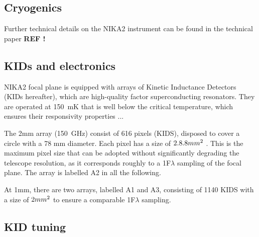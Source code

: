 \subsection{Cryogenics}
Further technical details on the NIKA2 instrument can be found in the
technical paper {\bf REF !}



\subsection{KIDs and electronics}

NIKA2 focal plane is equipped with arrays of Kinetic Inductance
Detectors (KIDs hereafter), which are high-quality factor
superconducting resonators. They are operated at 150~mK that is well
below the critical temperature, which ensures their responsivity
properties ... 


The 2mm array (150~GHz) consist of 616 pixels
(KIDS), disposed to cover a circle with a 78 mm diameter. Each pixel
has a size of $2.8 \time 2.8 mm^{2}$ . This is the maximum pixel size that can
be adopted without significantly degrading the telescope resolution,
as it corresponds roughly to a 1F$\lambda$ sampling of the focal
plane.  The array is labelled A2 in all the following.

At 1mm, there are two arrays, labelled A1 and A3, consisting of 1140
KIDS with a size of $2 \time 2 mm^{2}$ to ensure a comparable 1F$\lambda$
sampling.




\subsection{KID tuning}






